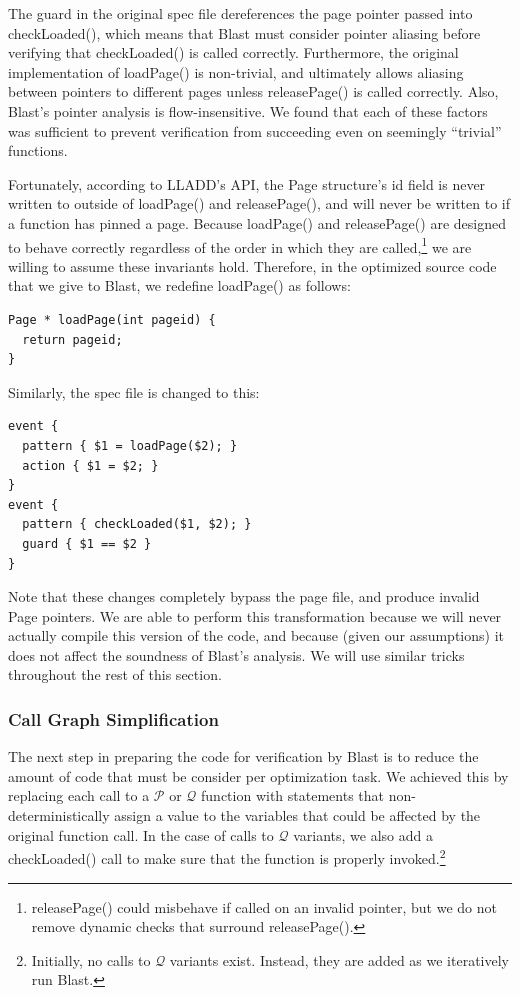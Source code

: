 \documentclass[10pt,letterpaper,twocolumn,english]{article}
\newcommand{\yad}{LLADD\xspace}
\newcommand{\pin}{loadPage()\xspace}
\newcommand{\unpin}{releasePage()\xspace}
\newcommand{\checkpage}{checkLoaded()\xspace}
\newcommand{\fP}{{$\mathcal P$}\xspace}
\newcommand{\fQ}{{$\mathcal Q$}\xspace}
\begin{document}
The guard in the original spec file dereferences the page pointer
passed into \checkpage, which means that Blast must consider pointer
aliasing before verifying that \checkpage is called correctly.
Furthermore, the original implementation of \pin is non-trivial, and
ultimately allows aliasing between pointers to different pages unless
\unpin is called correctly.  Also, Blast's pointer analysis is
flow-insensitive.  We found that each of these factors was sufficient
to prevent verification from succeeding even on seemingly ``trivial''
functions.  

Fortunately, according to \yad's API, the Page structure's id field is
never written to outside of \pin and \unpin, and will never be written
to if a function has pinned a page.  Because \pin and \unpin are
designed to behave correctly regardless of the order
in which they are called,\footnote{\unpin could misbehave if called on
an invalid pointer, but we do not remove dynamic checks that surround
\unpin.} we are willing to assume these invariants hold.  Therefore,
in the optimized source code that we give to Blast, we redefine
\pin as follows:

\begin{verbatim}
Page * loadPage(int pageid) {
  return pageid;
}
\end{verbatim}
Similarly, the spec file is changed to this:
\begin{verbatim}
event { 
  pattern { $1 = loadPage($2); }
  action { $1 = $2; }
}
event { 
  pattern { checkLoaded($1, $2); }  
  guard { $1 == $2 }
}
\end{verbatim}

Note that these changes completely bypass the page file, and produce invalid Page pointers.
We are able to perform this transformation because we will never
actually compile this version of the code, and because (given our
assumptions) it does not affect the soundness of Blast's analysis.  We
will use similar tricks throughout the rest of this section.

\subsubsection{Call Graph Simplification}

The next step in preparing the code for verification by Blast is to
reduce the amount of code that must be consider per optimization task.
We achieved this by replacing each call to a \fP or \fQ function with
statements that non-deterministically assign a value to the variables
that could be affected by the original function call.  In the case of
calls to \fQ variants, we also add a \checkpage call to make sure that
the function is properly invoked.\footnote{Initially, no calls to \fQ
variants exist.  Instead, they are added as we iteratively run Blast.}
\end{document}
